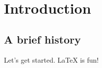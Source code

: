 \chapter{Introduction}
\label{chapter:Introduction}
\thispagestyle{myheadings}

\section{A brief history}
\label{sec:history}

Let's get started. LaTeX \cite{lamport1985:latex} is fun!
